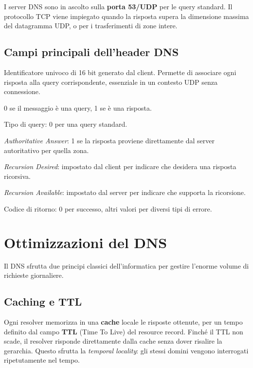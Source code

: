 \documentclass{article}
\begin{document}
I server DNS sono in ascolto sulla \textbf{porta 53/UDP} per le query
standard. Il protocollo TCP viene impiegato quando la risposta supera la
dimensione massima del datagramma UDP, o per i trasferimenti di zone intere.

\subsection*{Campi principali dell'header DNS}

\begin{description}[leftmargin=3cm, style=nextline]
    \item[Query ID / TXID] Identificatore univoco di 16 bit generato dal
        client. Permette di associare ogni risposta alla query corrispondente,
        essenziale in un contesto UDP senza connessione.
    \item[QR] 0 se il messaggio è una query, 1 se è una risposta.
    \item[Opcode] Tipo di query: 0 per una query standard.
    \item[AA] \emph{Authoritative Answer}: 1 se la risposta proviene
        direttamente dal server autoritativo per quella zona.
    \item[RD] \emph{Recursion Desired}: impostato dal client per indicare
        che desidera una risposta ricorsiva.
    \item[RA] \emph{Recursion Available}: impostato dal server per indicare
        che supporta la ricorsione.
    \item[RCODE] Codice di ritorno: 0 per successo, altri valori per diversi
        tipi di errore.
\end{description}


\section*{Ottimizzazioni del DNS}

Il DNS sfrutta due principi classici dell'informatica per gestire l'enorme
volume di richieste giornaliere.

\subsection*{Caching e TTL}

Ogni resolver memorizza in una \textbf{cache} locale le risposte ottenute,
per un tempo definito dal campo \textbf{TTL} (Time To Live) del resource
record. Finché il TTL non scade, il resolver risponde direttamente dalla
cache senza dover risalire la gerarchia. Questo sfrutta la
\emph{temporal locality}: gli stessi domini vengono interrogati
ripetutamente nel tempo.
\end{document}
